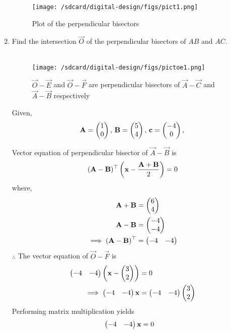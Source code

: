 \documentclass[11pt]{book}
\begin{document}
\begin{enumerate}[label=\thesection.\arabic*.,ref=\thesection.\theenumi]
\begin{figure}[H]
\centering
\texttt{[image: /sdcard/digital-design/figs/pict1.png]}
\caption{Plot of the perpendicular bisectors}
\label{fig:figure1}
\end{figure}


\item Find the intersection $\vec{O}$ of the perpendicular bisectors of $AB$ and $AC$.
 \\
\solution \\
\begin{figure}[H]
\centering
\texttt{[image: /sdcard/digital-design/figs/pictoe1.png]}
\caption{$\vec{O}-\vec{E}$ and $\vec{O}-\vec{F}$ are perpendicular bisectors of $\vec{A}-\vec{C}$ and $\vec{A}-\vec{B}$ respectively}
\label{fig:Figure_2}
\end{figure}

Given,
\begin{align}
\mathbf{A}=\begin{pmatrix}1 \\ 0\end{pmatrix},\,
\mathbf{B}=\begin{pmatrix}5\\4\end{pmatrix},\,
	\mathbf{c}=\begin{pmatrix}-4\\0\end{pmatrix},\,
\end{align}

Vector equation of perpendicular bisector of $\vec{A}-\vec{B}$ is
\begin{align}
 (\mathbf{A}-\mathbf{B})^\top  \left( \mathbf{x} - \frac{\mathbf{A}+\mathbf{B}}{2}\right) = 0
\end{align}
where,
\begin{align}
\mathbf{A}+\mathbf{B}
&=\begin{pmatrix}6\\4\end{pmatrix}\\
\mathbf{A}-\mathbf{B}
&=\begin{pmatrix}-4\\-4\end{pmatrix}\\
\implies (\mathbf{A}-\mathbf{B})^\top &= \begin{pmatrix}-4&-4\end{pmatrix}
\end{align}
$\therefore $ The vector equation of $\vec{O}-\vec{F}$ is
\begin{align}
\begin{pmatrix}-4&-4\end{pmatrix} \left( \mathbf{x}-\begin{pmatrix}3\\2\end{pmatrix} \right)&=0\\
\implies \begin{pmatrix}-4&-4\end{pmatrix}\mathbf{x}&=\begin{pmatrix}-4&-4\end{pmatrix}\begin{pmatrix}3\\2\end{pmatrix}
\end{align}
Performing matrix multiplication yields
\begin{align}
\begin{pmatrix}-4&-4\end{pmatrix}\mathbf{x}&=0
\end{align}\\


\end{enumerate}
\end{document}
